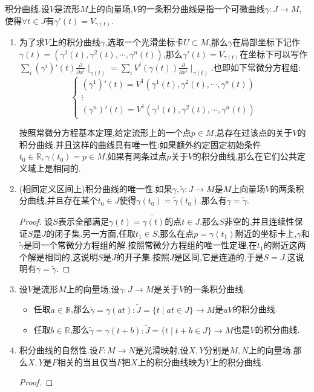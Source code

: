 积分曲线.设$V$是流形$M$上的向量场,$V$的一条积分曲线是指一个可微曲线$\gamma:J\to M$,使得$\forall t\in J$有$\gamma'(t)=V_{\gamma(t)}$.
\begin{enumerate}
	\item 为了求$V$上的积分曲线$\gamma$,选取一个光滑坐标卡$U\subset M$,那么$\gamma$在局部坐标下记作$\gamma(t)=(\gamma^1(t),\gamma^2(t),\cdots,\gamma^n(t))$,那么$\gamma'(t)=V_{\gamma(t)}$在坐标下可以写作$\sum_i(\gamma^i)'(t)\frac{\partial}{\partial x^i}\mid_{\gamma(t)}=\sum_iV^i(\gamma(t))\frac{\partial}{\partial x^i}\mid_{\gamma(t)}$.也即如下常微分方程组:
	$$\left\{\begin{array}{c}(\gamma^1)'(t)=V^1(\gamma^1(t),\gamma^2(t),\cdots,\gamma^n(t))\\\vdots\\(\gamma^n)'(t)=V^1(\gamma^1(t),\gamma^2(t),\cdots,\gamma^n(t))\end{array}\right.$$
	
	按照常微分方程基本定理,给定流形上的一个点$p\in M$,总存在过该点的关于$V$的积分曲线.并且这样的曲线具有唯一性:如果额外约定固定初始条件$t_0\in\mathbb{R},\gamma(t_0)=p\in M$,如果有两条过点$p$关于$V$的积分曲线,那么在它们公共定义域上是相同的.
	\item (相同定义区间上)积分曲线的唯一性.如果$\gamma,\widetilde{\gamma}:J\to M$是$M$上向量场$V$的两条积分曲线,并且存在某个$t_0\in J$使得$\gamma(t_0)=\widetilde{\gamma}(t_0)$.那么有$\gamma=\widetilde{\gamma}$.
	\begin{proof}
		
		设$S$表示全部满足$\gamma(t)=\widetilde{\gamma(t)}$的点$t\in J$.那么$S$非空的,并且连续性保证$S$是$J$的闭子集.另一方面,任取$t_1\in S$,那么在点$p=\gamma(t_1)$附近的坐标卡上,$\gamma$和$\widetilde{\gamma}$是同一个常微分方程组的解.按照常微分方程组的唯一性定理,在$t_1$的附近这两个解是相同的,这说明$S$是$J$的开子集.按照$J$是区间,它是连通的,于是$S=J$.这说明有$\gamma=\widetilde{\gamma}$.
	\end{proof}
	\item 设$V$是流形$M$上的向量场,设$\gamma:J\to M$是关于$V$的一条积分曲线.
	\begin{itemize}
		\item 任取$a\in\mathbb{R}$,那么$\widetilde{\gamma}=\gamma(at):\widetilde{J}=\{t\mid at\in J\}\to M$是$aV$的积分曲线.
		\item 任取$b\in\mathbb{R}$,那么$\widetilde{\gamma}=\gamma(t+b):\widetilde{J}=\{t\mid t+b\in J\}\to M$也是$V$的积分曲线.
	\end{itemize}
	\item 积分曲线的自然性.设$F:M\to N$是光滑映射,设$X,Y$分别是$M,N$上的向量场.那么$X,Y$是$F$相关的当且仅当$F$把$X$上的积分曲线映为$Y$上的积分曲线.
	\begin{proof}
		

\end{proof}
\end{enumerate}
